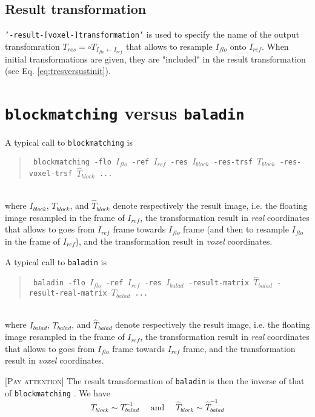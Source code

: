\documentclass[10pt]{report}
\def\baladin{\texttt{baladin} }
\def\blockmatching{\texttt{blockmatching} }
\newenvironment{attention}{\noindent \textsc{[Pay attention]}}{}
\newcommand{\option}[1]{{\texttt{'#1'}}}
\newenvironment{code}[1]{\mbox{}\\[1ex]\hspace*{-#1cm}\begin{minipage}{150mm}\begin{quote}\tt}{\end{quote}\end{minipage}\mbox{}\\[1ex]}
\begin{document}
\subsection{Result transformation}

\option{-result-[voxel-]transformation} is used to specify the name of the output transfomration 
$T_{res} = \circ T_{I_{flo} \leftarrow I_{ref}}$ that allows to resample $I_{flo}$ onto $I_{ref}$. When initial transformations are given, they are "included" in the result transformation (see Eq. \ref{eq:tresversustinit}).


\section{\blockmatching versus \baladin}


A typical call to \blockmatching is
\begin{code}{0.8}
\% \blockmatching -flo $I_{flo}$ -ref $I_{ref}$ -res $I_{block}$ 
   -res-trsf $T_{block}$ -res-voxel-trsf $\hat{T}_{block}$ ...
\end{code}
where $I_{block}$, $T_{block}$, and $\hat{T}_{block}$ denote respectively the result image, i.e. the floating image resampled in the frame of $I_{ref}$, the transformation result in \textit{real} coordinates that allows to goes from $I_{ref}$ frame towards $I_{flo}$ frame (and then to resample $I_{flo}$ in the frame of $I_{ref}$), and the transformation result in \textit{voxel} coordinates.

A typical call to \baladin is
\begin{code}{0.8}
\% \baladin -flo $I_{flo}$ -ref $I_{ref}$ -res $I_{balad}$ 
-result-matrix $\hat{T}_{balad}$ -result-real-matrix $T_{balad}$ ...
\end{code}
where $I_{balad}$, $T_{balad}$, and $\hat{T}_{balad}$ denote respectively the result image, i.e. the floating image resampled in the frame of $I_{ref}$, the transformation result in \textit{real} coordinates that allows to goes from $I_{flo}$ frame towards $I_{ref}$ frame, and the transformation result in \textit{voxel} coordinates.

\begin{attention} The result transformation of \baladin is then the inverse of that of \blockmatching. We have 
$$ T_{block} \sim T^{-1}_{balad} \quad \mbox{ and } \quad \hat{T}_{block} \sim \hat{T}^{-1}_{balad}
$$
\end{attention}
\end{document}
